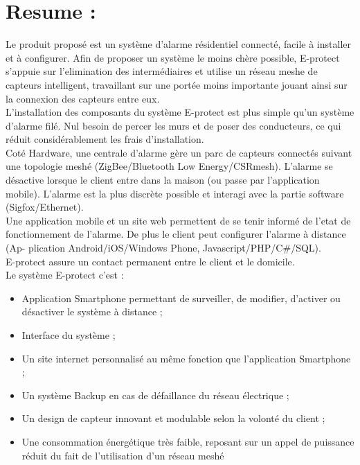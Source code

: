 \chapter{Resume :}

Le produit proposé est un système d'alarme résidentiel connecté, facile à installer et à configurer. Afin de proposer un système le moins chère possible, E-protect s'appuie sur l'elimination des intermédiaires et utilise un réseau meshe de capteurs intelligent, travaillant sur une portée moins importante jouant ainsi sur la connexion des capteurs entre eux.\\ L'installation des composants du système E-protect est plus simple qu'un système d'alarme filé. Nul besoin de percer les murs et de poser des conducteurs, ce qui réduit considérablement les frais d'installation.\\

Coté Hardware, une centrale d'alarme gère un parc de capteurs connectés suivant une topologie meshé (ZigBee/Bluetooth Low Energy/CSRmesh). L'alarme se désactive lorsque le client entre dans la maison (ou passe par l'application mobile). L'alarme est la plus discrète possible et interagi avec la partie software (Sigfox/Ethernet).\\

Une application mobile et un site web permettent de se tenir informé de l'etat de fonctionnement de l'alarme. De plus le client peut configurer l'alarme à distance (Ap- plication Android/iOS/Windows Phone, Javascript/PHP/C\#/SQL).\\

E-protect assure un contact permanent entre le client et le domicile.\\

Le système E-protect c'est :\\

\begin{itemize}
\item Application Smartphone permettant de surveiller, de modifier, d'activer ou désactiver le système à distance ;
\item Interface du système ;
\item Un site internet personnalisé au même fonction que l'application Smartphone ;
\item Un système Backup en cas de défaillance du réseau électrique ;
\item Un design de capteur innovant et modulable selon la volonté du client ;
\item Une consommation énergétique très faible, reposant sur un appel de puissance réduit du fait de l'utilisation d'un réseau meshé\\
\end{itemize}
